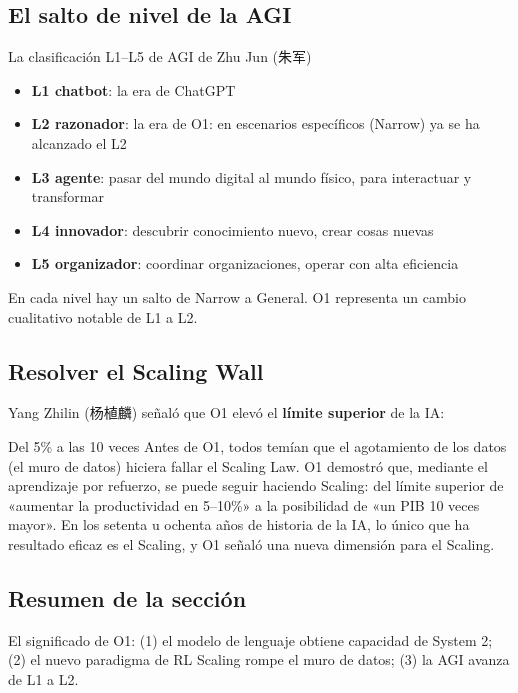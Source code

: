 \subsection{El salto de nivel de la AGI}

\begin{knowledgebox}{La clasificación L1--L5 de AGI de Zhu Jun (朱军)}
\begin{itemize}
\item \textbf{L1 chatbot}: la era de ChatGPT
\item \textbf{L2 razonador}: la era de O1: en escenarios específicos (Narrow) ya se ha alcanzado el L2
\item \textbf{L3 agente}: pasar del mundo digital al mundo físico, para interactuar y transformar
\item \textbf{L4 innovador}: descubrir conocimiento nuevo, crear cosas nuevas
\item \textbf{L5 organizador}: coordinar organizaciones, operar con alta eficiencia
\end{itemize}
En cada nivel hay un salto de Narrow a General. O1 representa un cambio cualitativo notable de L1 a L2.
\end{knowledgebox}

\subsection{Resolver el Scaling Wall}

Yang Zhilin (杨植麟) señaló que O1 elevó el \textbf{límite superior} de la IA:

\begin{importantbox}{Del 5\% a las 10 veces}
Antes de O1, todos temían que el agotamiento de los datos (el muro de datos) hiciera fallar el Scaling Law. O1 demostró que, mediante el aprendizaje por refuerzo, se puede seguir haciendo Scaling: del límite superior de «aumentar la productividad en 5--10\%» a la posibilidad de «un PIB 10 veces mayor». En los setenta u ochenta años de historia de la IA, lo único que ha resultado eficaz es el Scaling, y O1 señaló una nueva dimensión para el Scaling.
\end{importantbox}

\subsection{Resumen de la sección}

El significado de O1: (1) el modelo de lenguaje obtiene capacidad de System 2; (2) el nuevo paradigma de RL Scaling rompe el muro de datos; (3) la AGI avanza de L1 a L2.

